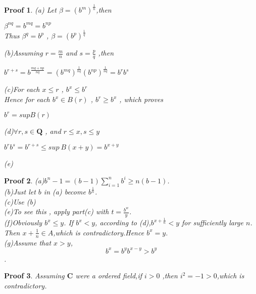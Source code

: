 \documentclass{report}
\newtheorem{myprf}{Proof}
\begin{document}
            \begin{myprf}
                
                (a) Let $\beta=(b^{m})^{\frac{1}{n}}$,then
                \begin{center}
                    $\beta^{nq}=b^{mq}=b^{np}$\\
                    Thus $\beta^{q}=b^{p}$ , $\beta=(b^{p})^{\frac{1}{q}}$\\
                \end{center}
                (b)Assuming $r=\frac{m}{n}$ and $s=\frac{p}{q}$ ,then\\
                \centerline{$b^{r+s}=b^{\frac{mq+np}{nq}}=
                        (b^{mq})^{\frac{1}{nq}}(b^{np})^{\frac{1}{nq}}=b^{r}b^{s}$}
                (c)For each $x \le r$ , $b^{x} \le b^{r}$\\
                    Hence for each $b^{x} \in B(r)$ , $b^{r} \ge b^{x}$ , which proves\\
                    \centerline{$b^{r}=supB(r)$}
                (d)$\forall r,s \in \mathbf{Q}$ , and $r \le x,s \le y$\\
                \centerline{$b^{r}b^{s} =b^{r+s} \le sup\ B(x+y)=b^{x+y}$}
                (e)

            \end{myprf} 
            \begin{myprf}
                (a)$b^{n}-1=(b-1)\sum_{i=1}^{n}b^{i} \ge n(b-1)$.\\
                (b)Just let $b$ in (a) become $b^{\frac{1}{n}}$.\\
                (c)Use (b)\\
                (e)To see this , apply part(c) with $t=\frac{b^w}{y}$.\\
                (f)Obviously $b^x \le y$.
                    If $b^x <y$, according to (d),$b^{x+\frac{1}{n}}<y$ for sufficiently large $n$.
                    Then $x+\frac{1}{n} \in A$,which is contradictory.Hence $b^x=y$.\\
                (g)Assume that $x>y$, \[b^x=b^yb^{x-y}>b^y\]. 
            \end{myprf} 
            \begin{myprf}
                Assuming $\mathbf{C}$ were a ordered field,if $i>0$ ,then $i^{2}=-1>0$,which is contradictory.
            \end{myprf}
\end{document}
